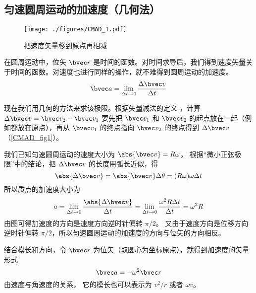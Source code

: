 

\subsection{匀速圆周运动的加速度（几何法）}

\begin{figure}[ht]
\centering
\texttt{[image: ./figures/CMAD\_1.pdf]}
\caption{把速度矢量移到原点再相减}\label{CMAD_fig1}
\end{figure}

在圆周运动中，位矢 $\bvec r$ 是时间的函数。对时间求导后，我们得到速度矢量关于时间的函数。对速度也进行同样的操作，就不难得到圆周运动的加速度。
\begin{equation}
\bvec a = \lim_{\Delta t \to 0} \frac{\Delta \bvec v}{\Delta t}
\end{equation}

现在我们用几何的方法来求该极限。根据矢量减法的定义%
，计算 $\Delta \bvec v = \bvec v_2 - \bvec v_1$ 要先把 $\bvec v_1$ 和 $\bvec v_2$ 的起点放在一起（例如都放在原点），再从 $\bvec v_1$ 的终点指向 $\bvec v_2$ 的终点得到 $\Delta \bvec v$ （\autoref{CMAD_fig1}）。 

我们已知匀速圆周运动的速度大小为 $\abs{\bvec v} = R\omega$， 根据“微小正弦极限”中的结论，把 $\Delta\bvec v$ 的长度用弧长近似，得
\begin{equation}
\abs{\Delta \bvec v} = \abs{\bvec v}\Delta \theta  = (R\omega)\omega \Delta t
\end{equation}
所以质点的加速度大小为
\begin{equation}
a =\lim_{\Delta t \to 0} \frac{\abs{\Delta \bvec v}}{\Delta t} =  \lim_{\Delta t \to 0} \frac{\omega ^2 R \Delta t}{\Delta t} = \omega ^2 R
\end{equation}
由图可得加速度的方向是速度方向逆时针偏转 $\pi/2$。 又由于速度方向是位移方向逆时针偏转 $\pi/2$，所以匀速圆周运动的加速度的方向与位矢的方向相反。

结合模长和方向，令 $\bvec r$ 为位矢（取圆心为坐标原点），就得到加速度的矢量形式
\begin{equation}\label{CMAD_eq4}
\bvec a =  - \omega ^2 \bvec r
\end{equation}
由速度与角速度的关系， %
它的模长也可以表示为 $v^2/r$ 或者 $\omega v$。

